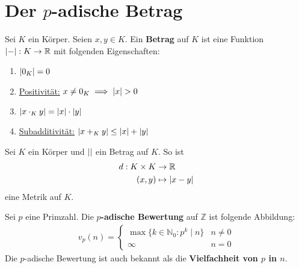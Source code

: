 \documentclass{report}
\newcommand{\tbf}[1]{\textbf{#1}}
\newcommand{\ul}[1]{\underline{#1}}
\newcommand{\bN}{\mathbb{N}}
\newcommand{\bR}{\mathbb{R}}
\newcommand{\bZ}{\mathbb{Z}}
\begin{document}
	\section{Der $p$-adische Betrag}
	\begin{definition}
		Sei $K$ ein Körper. Seien $x,y \in K$. Ein \tbf{Betrag} auf $K$ ist eine Funktion $\abs{-} : K \to \bR$ mit folgenden Eigenschaften:
		\begin{enumerate}
			\item $\abs{0_K} = 0$
			\item \ul{Positivität:} $x \neq 0_K \implies \abs{x} > 0$
			\item $\abs{x \cdot_K y} = \abs{x} \cdot \abs{y}$
			\item \ul{Subadditivität:} $\abs{x +_K y} \leq \abs{x} + \abs{y}$
		\end{enumerate}
	\end{definition}
	\begin{proposition}
		Sei $K$ ein Körper und $\abs{}$ ein Betrag auf $K$. So ist
		\begin{align*}
			d : K \times K &\to \bR\\
			(x,y) &\mapsto \abs{x - y}\\
		\end{align*}
		eine Metrik auf $K$.
	\end{proposition}
	\iffalse
	\begin{definition}
		Sei $K$ ein Körper und  $G$ eine linear geordnete Gruppe. Eine \tbf{Bewertung auf $K$} ist eine Abbildung $v : K \to G \cup \{\infty\}$ mit folgenden Eigenschaften:
		\begin{enumerate}
			\item $v(0) = \infty$
			\item $g \neq 0 \implies v(g) \neq \infty$ 
			\item $v(a \cdot_K b) = v(a) +_G v(b)$ (Bewertungen sind Gruppenhomomorphismen aus der Multiplikativen Gruppe von $K$ in $G$)
			\item $v(a +_K b) \geq \min(v(a), v(b))$ 
			\item $v(a) = v(b) \implies v(a +_K b) > \min(v(a), v(b))$
			\item $v(a) \neq v(b) \implies v(a +_K b) = \min(v(a), v(b))$
		\end{enumerate}
	\end{definition}
	\fi
	\begin{definition}
		Sei $p$ eine Primzahl. Die \tbf{$p$-adische Bewertung} auf $\bZ$ ist folgende Abbildung:
		\begin{align*}
			v_p(n) = 
			\begin{cases}
				\max\{k \in \bN_0 : p^k \mid n\} & n \neq 0\\
				\infty & n = 0
			\end{cases}
		\end{align*}
		Die $p$-adische Bewertung ist auch bekannt als die \tbf{Vielfachheit von $p$ in $n$}.
	\end{definition}
\end{document}
